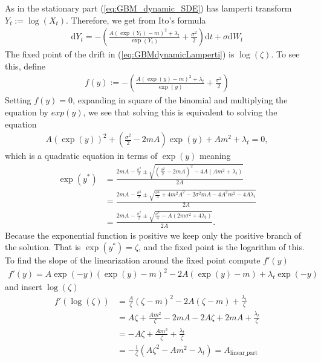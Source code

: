 As in the stationary part (\ref{eq:GBM_dynamic_SDE}) has lamperti transform $Y_t:=\log(X_t)$. Therefore, we get from Ito's formula
\begin{align}
    \mathrm{d}Y_t = - \left(\frac{A\left(\exp\left(Y_t\right)-m\right)^2 + \lambda_t}{\exp(Y_t)} + \frac{\sigma^2}{2}\right)\mathrm{d}t + \sigma \mathrm{d}W_t \label{eq:GBMdynamicLamperti}
\end{align}
The fixed point of the drift in (\ref{eq:GBMdynamicLamperti}) is $\log\left(\zeta\right)$. To see this, define
\begin{align}
    f(y) := -\left(\frac{A\left(\exp\left(y\right)-m\right)^2 + \lambda_t}{\exp(y)} + \frac{\sigma^2}{2}\right)
\end{align}
Setting $f(y) = 0$, expanding in square of the binomial and multiplying the equation by $exp(y)$, we see that solving this is equivalent to solving the equation
\begin{align}
    A\left(\exp\left(y\right)\right)^2 + \left(\frac{\sigma^2}{2} - 2mA\right)\exp\left(y\right) + Am^2 + \lambda_t = 0,
\end{align}
which is a quadratic equation in terms of $\exp(y)$ meaning
\begin{align}
    \exp(y^*) &= \frac{2mA - \frac{\sigma^2}{2}\pm\sqrt{\left(\frac{\sigma^2}{2} - 2mA\right)^2 - 4A\left(Am^2 + \lambda_t\right)}}{2A}\nonumber \\
    &= \frac{2mA - \frac{\sigma^2}{2}\pm\sqrt{\frac{\sigma^4}{4} + 4m^2A^2 - 2\sigma^2mA-4A^2m^2-4A\lambda_t}}{2A}\nonumber \\
    &= \frac{2mA - \frac{\sigma^2}{2}\pm\sqrt{\frac{\sigma^4}{4}-A\left(2m\sigma^2 + 4\lambda_t\right)}}{2A}.
\end{align}
Because the exponential function is positive we keep only the positive branch of the solution. That is $\exp\left(y^*\right) = \zeta$, and the fixed point is the logarithm of this. To find the slope of the linearization around the fixed point compute $f'(y)$
\begin{align}
    f'(y) = A\exp(-y)\left(\exp(y) - m\right)^2 - 2A\left(\exp(y) - m\right) + \lambda_t\exp(-y)
\end{align}
and insert $\log(\zeta)$
\begin{align}
    f'(\log(\zeta)) &= \frac{A}{\zeta}\left(\zeta - m\right)^2 - 2A\left(\zeta - m\right) + \frac{\lambda_t}{\zeta}\nonumber \\
    &= A\zeta + \frac{Am^2}{\zeta} - 2mA - 2A\zeta + 2mA + \frac{\lambda_t}{\zeta}\nonumber\\
    &=-A\zeta + \frac{Am^2}{\zeta} + \frac{\lambda_t}{\zeta}\nonumber\\
    &= -\frac{1}{\zeta}\left(A\zeta^2 - Am^2 - \lambda_t\right) =  A_{\mathrm{linear\_part}}
\end{align}
